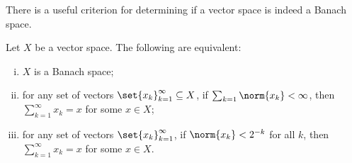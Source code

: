 There is a useful criterion for determining if a vector space is indeed a Banach space.
\begin{proposition}\label{prop:absolute_convergence_criterion}
  Let $X$ be a vector space. The following are equivalent:
  \begin{enumerate}[(i)]
    \item $X$ is a Banach space;
    \item for any set of vectors $\set{x_k}_{k=1}^{\infty}\subseteq X$, if $\sum_{k=1}\norm{x_k} < \infty$, then $\sum_{k=1}^{\infty}x_k = x$ for some $x\in X$;
    \item for any set of vectors $\set{x_k}_{k=1}^{\infty}$, if $\norm{x_k} < 2^{-k}$ for all $k$, then $\sum_{k=1}^{\infty}x_k = x$ for some $x\in X$.
  \end{enumerate}
\end{proposition}

